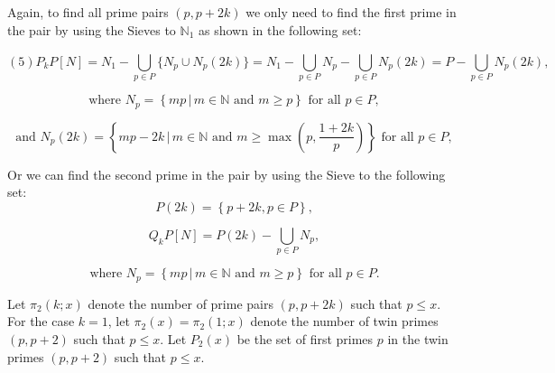 \documentclass{article}
\begin{document}
\vspace{1\baselineskip}

Again, to find all prime pairs \( (p, p+2k) \) we only need to find the first prime in the pair by using the Sieves to \(\mathbb{N}_1\) as shown in the following set:


\begin{equation}
\left(5\right)         P_{k}P\left[N\right] = N_{1}-\bigcup_{p\in P}^{}\{  N_{p}\cup N_{p}(2k)\}  =  N_{1} - \bigcup_{p\in P}^{} N_{p}- \bigcup_{p\in P}^{} N_{p}(2k) = P- \bigcup_{p\in P}^{} N_{p}(2k), 
\end{equation}


\begin{equation}
\text{where } N_{p} = \left\{ mp \, | \, m \in \mathbb{N} \text{ and } m \geq p \right\} \text{ for all } p \in P,
\end{equation}


\begin{equation}
\text{and } N_{p}(2k) = \left\{ mp-2k \, | \, m \in \mathbb{N} \text{ and } m \geq \max\left( p, \frac{1+2k}{p} \right) \right\} \text{ for all } p \in P,
\end{equation}

\begin{center}
Or we can find the second prime in the pair by using  the Sieve to the following set:\textbf{\textit{ \\ }}\begin{equation}
P(2k) =\left\{  p+2k,  p\in P\right\}  ,
\end{equation}


\begin{equation}
Q_{k}P[N] = P(2k) - \bigcup_{p \in P} N_{p},
\end{equation}

\begin{equation}
\text{where } N_{p} = \left\{ mp \, | \, m \in \mathbb{N} \text{ and } m \geq p \right\} \text{ for all } p \in P.
\end{equation}
\end{center}

Let \( \pi_{2}(k;x) \) denote the number of prime pairs \( (p, p+2k) \) such that \( p \leq x \). For the case \( k = 1 \), let \( \pi_{2}(x) = \pi_{2}(1;x) \) denote the number of twin primes \( (p, p+2) \) such that \( p \leq x \). Let \( P_{2}(x) \) be the set of first primes \( p \) in the twin primes \( (p, p+2) \) such that \( p \leq x \).
\vspace{1\baselineskip}
\end{document}
